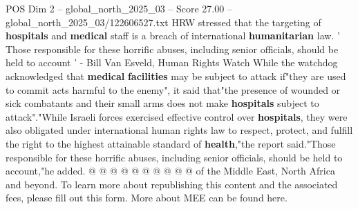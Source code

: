 \begin{textsample}{POS Dim 2 – global\_north\_2025\_03 – Score 27.00 – global\_north\_2025\_03/122606527.txt}
HRW stressed that the targeting of \textbf{hospitals} and \textbf{medical} staff is a breach of international \textbf{humanitarian} law. ' Those responsible for these horrific abuses, including senior officials, should be held to account ' - Bill Van Esveld, Human Rights Watch While the watchdog acknowledged that \textbf{medical} \textbf{facilities} may be subject to attack if"they are used to commit acts harmful to the enemy", it said that"the presence of wounded or sick combatants and their small arms does not make \textbf{hospitals} subject to attack"."While Israeli forces exercised effective control over \textbf{hospitals}, they were also obligated under international human rights law to respect, protect, and fulfill the right to the highest attainable standard of \textbf{health},"the report said."Those responsible for these horrific abuses, including senior officials, should be held to account,"he added. @ @ @ @ @ @ @ @ @ @ of the Middle East, North Africa and beyond.
To learn more about republishing this content and the associated fees, please fill out this form.
More about MEE can be found here.

\end{textsample}
